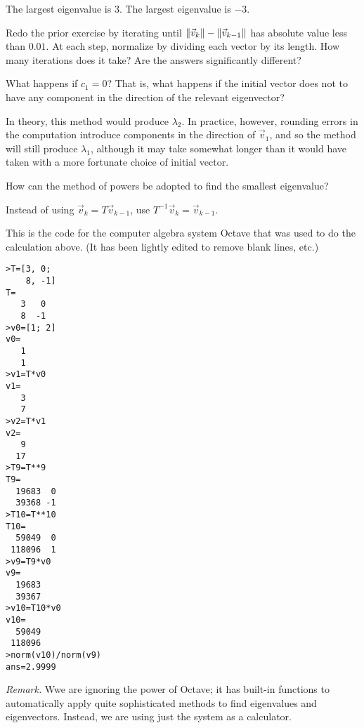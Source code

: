 \begin{exercises}
    \begin{answer}
     \begin{exparts}
       \partsitem The largest eigenvalue is $3$.
       \partsitem The largest eigenvalue is $-3$.
     \end{exparts}
    \end{answer}
  \item 
     Redo the prior exercise by iterating until 
     $\|\vec{v}_k\|-\|\vec{v}_{k-1}\|$ has absolute value less than
     $0.01$.
     At each step, normalize by dividing each vector by its length.
     How many iterations does it take?
     Are the answers significantly different?
  \item 
      What happens if $c_1=0$?
      That is, what happens if the initial vector does not to have any 
      component in the direction of the relevant eigenvector?
     \begin{answer}
       In theory, this method would produce $\lambda_2$.
       In practice, however, rounding errors in the computation introduce
       components in the direction of $\vec{v}_1$, and so the method will
       still produce $\lambda_1$, although it may take somewhat longer than
       it would have taken with a more fortunate choice of initial vector. 
     \end{answer}
  \item 
    How can the method of powers
    be adopted to find the smallest eigenvalue?
    \begin{answer}
      Instead of using $\vec{v}_k=T\vec{v}_{k-1}$, 
      use $T^{-1}\vec{v}_k=\vec{v}_{k-1}$.
    \end{answer}
\end{exercises}

This is the code for the computer algebra system Octave that was used to
do the calculation above.
(It has been lightly edited to remove blank lines, etc.)
\begin{lstlisting}
>T=[3, 0;
    8, -1]
T=
   3   0
   8  -1
>v0=[1; 2]
v0=
   1
   1
>v1=T*v0
v1=
   3
   7
>v2=T*v1
v2=
   9
  17
>T9=T**9
T9=
  19683  0
  39368 -1
>T10=T**10
T10=
  59049  0
 118096  1
>v9=T9*v0
v9=
  19683
  39367
>v10=T10*v0
v10=
  59049
 118096
>norm(v10)/norm(v9)
ans=2.9999
\end{lstlisting}
\textit{Remark.}
Wwe are ignoring the power of Octave;
it has built-in functions to automatically
apply quite sophisticated methods to find eigenvalues and eigenvectors.
Instead, we are using just the system as a calculator. 

\endinput





